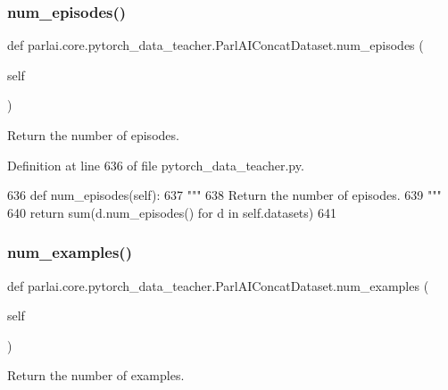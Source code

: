 \subsubsection{\texorpdfstring{num\+\_\+episodes()}{num\_episodes()}}
{\footnotesize\ttfamily def parlai.\+core.\+pytorch\+\_\+data\+\_\+teacher.\+Parl\+A\+I\+Concat\+Dataset.\+num\+\_\+episodes (\begin{DoxyParamCaption}\item[{}]{self }\end{DoxyParamCaption})}

\begin{DoxyVerb}Return the number of episodes.
\end{DoxyVerb}
 

Definition at line 636 of file pytorch\+\_\+data\+\_\+teacher.\+py.


\begin{DoxyCode}
636     \textcolor{keyword}{def }num\_episodes(self):
637         \textcolor{stringliteral}{"""}
638 \textcolor{stringliteral}{        Return the number of episodes.}
639 \textcolor{stringliteral}{        """}
640         \textcolor{keywordflow}{return} sum(d.num\_episodes() \textcolor{keywordflow}{for} d \textcolor{keywordflow}{in} self.datasets)
641 
\end{DoxyCode}
\mbox{\label{classparlai_1_1core_1_1pytorch__data__teacher_1_1ParlAIConcatDataset_a18b104ac4b013780a973cf8655b8406a}} 
\subsubsection{\texorpdfstring{num\+\_\+examples()}{num\_examples()}}
{\footnotesize\ttfamily def parlai.\+core.\+pytorch\+\_\+data\+\_\+teacher.\+Parl\+A\+I\+Concat\+Dataset.\+num\+\_\+examples (\begin{DoxyParamCaption}\item[{}]{self }\end{DoxyParamCaption})}

\begin{DoxyVerb}Return the number of examples.
\end{DoxyVerb}
 

